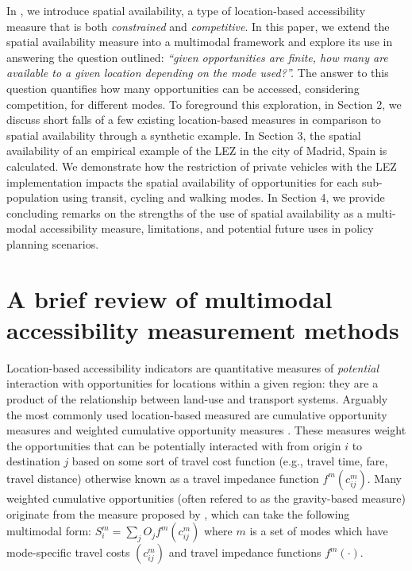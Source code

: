 \documentclass[numbered]{trbunofficial}
\begin{document}
In \citet{soukhovIntroducingSpatialAvailability2023}, we introduce
spatial availability, a type of location-based accessibility measure
that is both \emph{constrained} and \emph{competitive}. In this paper,
we extend the spatial availability measure into a multimodal framework
and explore its use in answering the question outlined: \emph{``given
opportunities are finite, how many are available to a given location
depending on the mode used?''.} The answer to this question quantifies
how many opportunities can be accessed, considering competition, for
different modes. To foreground this exploration, in Section 2, we
discuss short falls of a few existing location-based measures in
comparison to spatial availability through a synthetic example. In
Section 3, the spatial availability of an empirical example of the LEZ
in the city of Madrid, Spain is calculated. We demonstrate how the
restriction of private vehicles with the LEZ implementation impacts the
spatial availability of opportunities for each sub-population using
transit, cycling and walking modes. In Section 4, we provide concluding
remarks on the strengths of the use of spatial availability as a
multi-modal accessibility measure, limitations, and potential future
uses in policy planning scenarios.

\hypertarget{a-brief-review-of-multimodal-accessibility-measurement-methods}{%
\section{A brief review of multimodal accessibility measurement
methods}\label{a-brief-review-of-multimodal-accessibility-measurement-methods}}

Location-based accessibility indicators are quantitative measures of
\emph{potential} interaction with opportunities for locations within a
given region: they are a product of the relationship between land-use
and transport systems. Arguably the most commonly used location-based
measured are cumulative opportunity measures and weighted cumulative
opportunity measures \citep{levinsonTransportAccessManual2020}. These
measures weight the opportunities that can be potentially interacted
with from origin \(i\) to destination \(j\) based on some sort of travel
cost function (e.g., travel time, fare, travel distance) otherwise known
as a travel impedance function \(f^{m}(c^m_{ij})\). Many weighted
cumulative opportunities (often refered to as the gravity-based measure)
originate from the measure proposed by
\citet{hansenHowAccessibilityShapes1959}, which can take the following
multimodal form: \(S_i^m = \sum_j O_j f^m(c_{ij}^m)\) where \(m\) is a
set of modes which have mode-specific travel costs \((c_{ij}^m)\) and
travel impedance functions \(f^m(\cdot)\).
\end{document}
